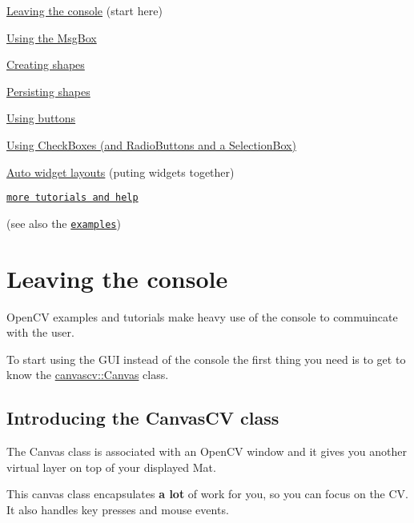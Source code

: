
\begin{DoxyItemize}
\item \hyperlink{tutscreentext}{Leaving the console} (start here)
\item \hyperlink{tutmsgbox}{Using the Msg\+Box}
\item \hyperlink{tutshapes}{Creating shapes}
\item \hyperlink{tutpersistency}{Persisting shapes}
\item \hyperlink{tutbuttons}{Using buttons}
\item \hyperlink{tutcheckbox}{Using Check\+Boxes (and Radio\+Buttons and a Selection\+Box)}
\item \hyperlink{tutlayouts}{Auto widget layouts} (puting widgets together)
\item \href{https://sagi-z.github.io/CanvasCV/support}{\tt more tutorials and help}
\end{DoxyItemize}

(see also the \href{examples.html}{\tt examples}) \hypertarget{tutscreentext}{}\section{Leaving the console}\label{tutscreentext}
Open\+CV examples and tutorials make heavy use of the console to commuincate with the user.

To start using the G\+UI instead of the console the first thing you need is to get to know the \hyperlink{classcanvascv_1_1Canvas}{canvascv\+::\+Canvas} class.\hypertarget{tutscreentext_screentext_s1}{}\subsection{Introducing the Canvas\+C\+V class}\label{tutscreentext_screentext_s1}
The Canvas class is associated with an Open\+CV window and it gives you another virtual layer on top of your displayed Mat.

This canvas class encapsulates {\bfseries a lot} of work for you, so you can focus on the CV. It also handles key presses and mouse events.

